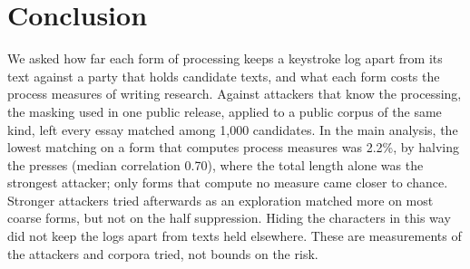 \section{Conclusion}
\label{sec:conclusion}

We asked how far each form of processing keeps a keystroke log apart from its text against a party that holds
candidate texts, and what each form costs the process measures of writing research. Against attackers that know the
processing, the masking used in one public release, applied to a public corpus of the same kind, left every essay
matched among 1,000 candidates. In the main analysis, the lowest matching on a form that computes process measures was
2.2\%, by halving the presses (median correlation 0.70), where the total length alone was the strongest attacker;
only forms that compute no measure came closer to chance. Stronger attackers tried afterwards as an exploration matched
more on most coarse forms, but not on the half suppression. Hiding the characters in this way did not keep the logs apart from texts held elsewhere. These are
measurements of the attackers and corpora tried, not bounds on the risk.
